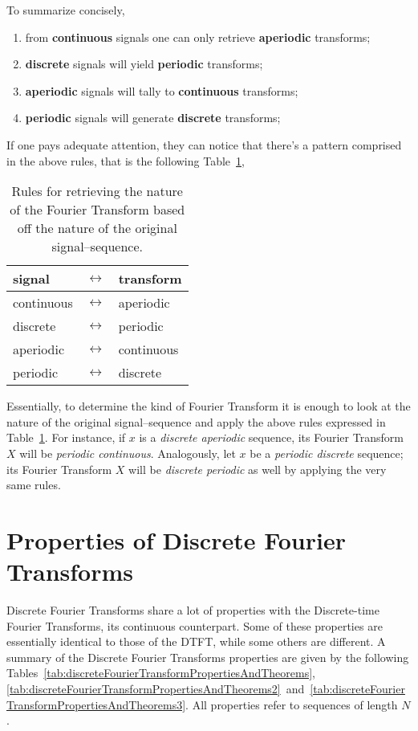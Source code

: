 \documentclass[\documentfontsize, twocolumn]{\classname}
\begin{document}
To summarize concisely,
\begin{enumerate}
    \item from \textbf{continuous} signals one can only retrieve \textbf{aperiodic} transforms;
    \item \textbf{discrete} signals will yield \textbf{periodic} transforms;
    \item \textbf{aperiodic} signals will tally to \textbf{continuous} transforms;
    \item \textbf{periodic} signals will generate \textbf{discrete} transforms;
\end{enumerate}

If one pays adequate attention, they can notice that there's a pattern comprised in the above rules, that is the following Table~\ref{tab:fourierTransformRules},
\begin{table}[ht]
\centering
\begin{tabular}{|l|c|l|}
    \hline
    \textbf{signal} & $\longleftrightarrow$ & \textbf{transform} \\
    \hline
    continuous & $\longleftrightarrow$ & aperiodic\\
    \hline
    discrete & $\longleftrightarrow$ & periodic\\
    \hline
    aperiodic & $\longleftrightarrow$ & continuous\\
    \hline
    periodic & $\longleftrightarrow$ & discrete\\
    \hline
\end{tabular}
\caption{Rules for retrieving the nature of the Fourier Transform based off the nature of the original signal--sequence.}\label{tab:fourierTransformRules}
\end{table}

Essentially, to determine the kind of Fourier Transform it is enough to look at the nature of the original signal--sequence and apply the above rules expressed in Table~\ref{tab:fourierTransformRules}. For instance, if $x$ is a \emph{discrete aperiodic} sequence, its Fourier Transform $X$ will be \emph{periodic continuous}. Analogously, let $x$ be a \emph{periodic discrete} sequence; its Fourier Transform $X$ will be \emph{discrete periodic} as well by applying the very same rules.

\section{Properties of Discrete Fourier Transforms}

Discrete Fourier Transforms share a lot of properties with the Discrete-time Fourier Transforms, its continuous counterpart. Some of these properties are essentially identical to those of the DTFT, while some others are different. A summary of the Discrete Fourier Transforms properties are given by the following Tables~\ref{tab:discreteFourierTransformPropertiesAndTheorems}, \ref{tab:discreteFourierTransformPropertiesAndTheorems2}~and~\ref{tab:discreteFourierTransformPropertiesAndTheorems3}. All properties refer to sequences of length $N$.
\end{document}
